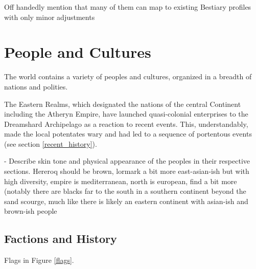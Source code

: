 Off handedly mention that many of them can map to existing Bestiary profiles with only minor adjustments



\section{People and Cultures}

The world contains a variety of peoples and cultures, organized in a breadth of nations and polities.

The Eastern Realms, which designated the nations of the central Continent including the Atheryn Empire, have launched quasi-colonial enterprises to the Dreamshard Archipelago as a reaction to recent events. This, understandably, made the local potentates wary and had led to a sequence of portentous events (see section \ref{recent_history}).






- Describe skin tone and physical appearance of the peoples in their respective sections. Hereroq should be brown, lormark a bit more east-asian-ish but with high diversity, empire is mediterranean, north is european, find a bit more (notably there are blacks far to the south in a southern continent beyond the sand scourge, much like there is likely an eastern continent with asian-ish and brown-ish people



\subsection{Factions and History}

Flags in Figure \ref{flags}.


